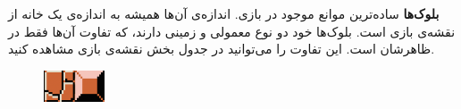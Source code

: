 \documentclass{utap}
\begin{document}
	\begin{itemize}
		\begin{minipage}{.75\textwidth}
		\item
\textbf{بلوک‌ها}
ساده‌ترین موانع موجود در بازی. اندازه‌ی آن‌ها همیشه به اندازه‌ی یک خانه‌ از نقشه‌ی بازی است. بلوک‌ها خود دو نوع معمولی و زمینی دارند، که تفاوت آن‌ها فقط در ظاهرشان است. این تفاوت را می‌توانید در جدول بخش نقشه‌ی بازی مشاهده کنید.
\end{minipage}
\begin{minipage}{.15\textwidth}
\begin{figure}[H]
	\begin{center}
		\includegraphics[width=1.8cm]{blocks}
	\end{center}
\end{figure}
\end{minipage}

\begin{minipage}{.75\textwidth}
		\item
		

\end{minipage}
\end{itemize}
\end{document}
